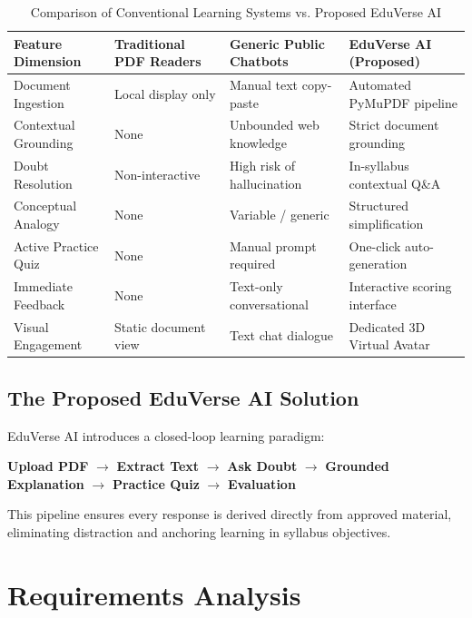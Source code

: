 \documentclass[11pt,a4paper]{report}
\begin{document}
\begin{table}[H]
\centering
\footnotesize
\renewcommand{\arraystretch}{1.08}
\begin{tabularx}{\textwidth}{lXXX}
\toprule
\textbf{Feature Dimension} & \textbf{Traditional PDF Readers} & \textbf{Generic Public Chatbots} & \textbf{EduVerse AI (Proposed)} \\
\midrule
Document Ingestion & Local display only & Manual text copy-paste & Automated PyMuPDF pipeline \\
Contextual Grounding & None & Unbounded web knowledge & Strict document grounding \\
Doubt Resolution & Non-interactive & High risk of hallucination & In-syllabus contextual Q\&A \\
Conceptual Analogy & None & Variable / generic & Structured simplification \\
Active Practice Quiz & None & Manual prompt required & One-click auto-generation \\
Immediate Feedback & None & Text-only conversational & Interactive scoring interface \\
Visual Engagement & Static document view & Text chat dialogue & Dedicated 3D Virtual Avatar \\
\bottomrule
\end{tabularx}
\caption{Comparison of Conventional Learning Systems vs. Proposed EduVerse AI}
\label{tab:comparison}
\end{table}

\section{The Proposed EduVerse AI Solution}
EduVerse AI introduces a closed-loop learning paradigm:
\begin{center}
    \small\textbf{Upload PDF} $\longrightarrow$ \textbf{Extract Text} $\longrightarrow$ \textbf{Ask Doubt} $\longrightarrow$ \textbf{Grounded Explanation} $\longrightarrow$ \textbf{Practice Quiz} $\longrightarrow$ \textbf{Evaluation}
\end{center}
This pipeline ensures every response is derived directly from approved material, eliminating distraction and anchoring learning in syllabus objectives.
\clearpage

\chapter{Requirements Analysis}
\label{ch:requirements}
\end{document}
